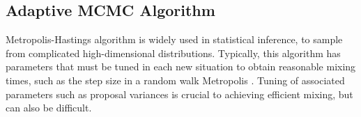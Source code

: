 %
%



\subsection*{Adaptive MCMC Algorithm}


Metropolis-Hastings algorithm is widely used in statistical inference, to sample from complicated high-dimensional distributions. Typically, this algorithm has parameters that must be tuned in each new situation to obtain reasonable mixing times, such as the step size in a random walk Metropolis \citep{mahendran2012adaptive}. Tuning of associated parameters such as proposal variances is crucial to achieving efficient mixing, but can also be difficult. 

